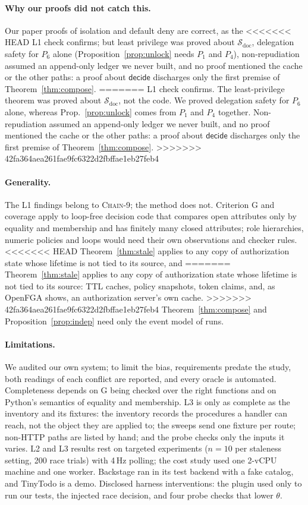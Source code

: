 \documentclass[sigconf,review,anonymous]{acmart}
\newcommand{\chain}{\textsc{Chain-9}\xspace}
\newcommand{\decide}{\mathsf{decide}}
\begin{document}
\paragraph{Why our proofs did not catch this.} Our paper proofs of isolation and default deny are correct, as the
<<<<<<< HEAD
L1 check confirms; but least privilege was proved about $\mathcal{S}_{\mathrm{doc}}$, delegation safety for $P_6$ alone
(Proposition~\ref{prop:unlock} needs $P_1$ and $P_4$), non-repudiation assumed an append-only ledger we never built, and
no proof mentioned the cache or the other paths: a proof about $\decide$ discharges only the first premise of
Theorem~\ref{thm:compose}.
=======
L1 check confirms. The least-privilege theorem was proved about $\mathcal{S}_{\mathrm{doc}}$, not the code. We proved delegation
safety for $P_6$ alone, whereas Prop.~\ref{prop:unlock} comes from $P_1$ and $P_4$ together. Non-repudiation assumed an
append-only ledger we never built, and no proof mentioned the cache or the other paths: a proof about $\decide$
discharges only the first premise of Theorem~\ref{thm:compose}.
>>>>>>> 42fa364aea261fae9fc6322d2fbffae1eb27feb4

\paragraph{Generality.} The L1 findings belong to \chain; the method does not. Criterion G and coverage apply to
loop-free decision code that compares open attributes only by equality and membership and has finitely many closed
attributes; role hierarchies, numeric policies and loops would need their own observations and checker rules.
<<<<<<< HEAD
Theorem~\ref{thm:stale} applies to any copy of authorization state whose lifetime is not tied to its source, and
=======
Theorem~\ref{thm:stale} applies to any copy of authorization state whose lifetime is not tied to its source: TTL
caches, policy snapshots, token claims, and, as OpenFGA shows, an authorization server's own cache.
>>>>>>> 42fa364aea261fae9fc6322d2fbffae1eb27feb4
Theorem~\ref{thm:compose} and Proposition~\ref{prop:indep} need only the event model of runs.

\paragraph{Limitations.} We audited our own system; to limit the bias,
requirements predate the study, both readings of each conflict are reported, and every oracle is automated. Completeness depends on G being checked over the right
functions and on Python's semantics of equality and membership. L3 is only as complete as the
inventory and its fixtures: the inventory records the procedures a handler can reach, not the object they are applied
to; the sweeps send one fixture per route; non-HTTP paths are listed by hand; and the probe checks only the inputs it
varies. L2 and L3 results rest on targeted
experiments ($n=10$ per staleness setting, 200 race trials) with 4\,Hz polling; the cost study used one 2-vCPU machine
and one worker. Backstage ran in its test backend with a fake catalog, and TinyTodo is a demo. Disclosed harness
interventions: the plugin used only to run our tests, the injected race decision, and four probe checks that lower
$\theta$.
\end{document}
